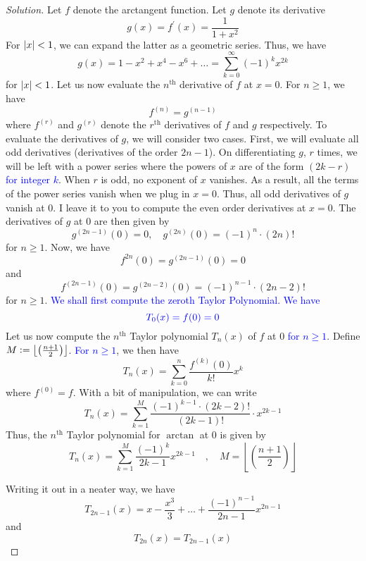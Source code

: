\documentclass[12pt]{article}
\theoremstyle{definition}
\newenvironment{soln}{\begin{proof}[Solution]}{\end{proof}}
\begin{document}
\begin{enumerate}[leftmargin=*]
    \begin{soln}
        Let $f$ denote the arctangent function. Let $g$ denote its derivative
        \[
            g(x) = f^{\prime}(x) = \frac{1}{1+x^2}
        \]
        For $\abs{x} < 1$, we can expand the latter as a geometric series. Thus, we have
        \[
            g(x) = 1 - x^2 + x^4 - x^6 + \ldots = \sum_{k=0}^{\infty} (-1)^k x^{2k}
        \]
        for $\abs{x} < 1$. Let us now evaluate the $n^{\text{th}}$ derivative of $f$ at $x=0$. For $n \geq 1$, we have
        \[
            f^{(n)} = g^{(n-1)}
        \]
        where $f^{(r)}$ and $g^{(r)}$ denote the $r^{\text{th}}$ derivatives of $f$ and $g$ respectively. To evaluate the derivatives of $g$, we will consider two cases. First, we will evaluate all odd derivatives (derivatives of the order $2n-1$). On differentiating $g$, $r$ times, we will be left with a power series where the powers of $x$ are of the form $(2k-r)$ \textcolor{blue}{for integer $k$}. When $r$ is odd, no exponent of $x$ vanishes. As a result, all the terms of the power series vanish when we plug in $x=0$. Thus, all odd derivatives of $g$ vanish at $0$. I leave it to you to compute the even order derivatives at $x=0$. The derivatives of $g$ at $0$ are then given by
        \[
            g^{(2n-1)}(0) = 0, \quad g^{(2n)}(0) = (-1)^n \cdot (2n)!
        \]
        for $n \geq 1$. Now, we have
        \[
            f^{2n}(0) = g^{(2n-1)}(0) = 0
        \]
        and
        \[
            f^{(2n-1)}(0) = g^{(2n-2)}(0) = (-1)^{n-1} \cdot (2n-2)!
        \]
        for $n \geq 1$. \textcolor{blue}{We shall first compute the zeroth Taylor Polynomial. We have}
        \[
            \textcolor{blue}{T_0(x) = f(0) = 0}
        \]  
        Let us now compute the $n^{\text{th}}$ Taylor polynomial $T_n(x)$ of $f$ at $0$ \textcolor{blue}{for $n \geq 1$}. Define $M \vcentcolon= \left\lfloor \left( \frac{n+1}{2} \right)  \right\rfloor$.   \textcolor{blue}{ For $n \geq 1$}, we then have
        \[
            T_n(x) = \sum_{k=0}^{n} \frac{f^{(k)}(0)}{k!} x^k
        \]
        where $f^{(0)} = f$. With a bit of manipulation, we can write 
        \[
            T_n(x) = \sum_{k=1}^{M} \frac{(-1)^{k-1} \cdot (2k-2)!}{(2k-1)!} \cdot x^{2k-1}
        \]  
        Thus, the $n^{\text{th}}$ Taylor polynomial for $\arctan$ at $0$ is given by
        \[
            T_n(x) = \sum_{k=1}^{M} \frac{(-1)^k}{2k-1} x^{2k-1} \quad , \quad M = \left\lfloor \left( \frac{n+1}{2} \right) \right\rfloor
        \]
        
        Writing it out in a neater way, we have
        \[
            T_{2n-1}(x) = x - \frac{x^3}{3} + \ldots + \frac{(-1)^{n-1}}{2n-1} x^{2n-1} 
        \]
        and 
        \[
            T_{2n}(x) = T_{2n-1}(x)
        \]
        

\end{soln}
\end{enumerate}
\end{document}
